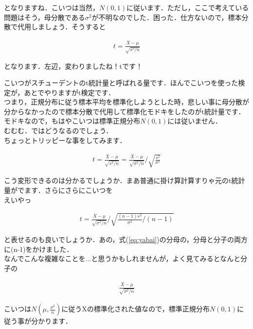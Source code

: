 \documentclass[11pt,a4paper]{ujreport} 	%
\begin{document}
となりますね．こいつは当然，$N(0,1)$に従います．ただし，ここで考えている問題はそう，母分散である$\sigma^2$が不明なのでした．困った．仕方ないので，標本分散で代用しましょう．そうすると

\begin{align}
  t = \frac{\bar{X}- \mu}{\sqrt{s^2/n}}
  \label{eq:t-value}
\end{align}

となります．左辺，変わりましたね！tです！

こいつがスチューデントのt統計量と呼ばれる量です．ほんでこいつを使った検定が，あとでやりますがt検定です．\\

つまり，正規分布に従う標本平均を標準化しようとした時，悲しい事に母分散が分からなかったので標本分散で代用して標準化モドキをしたのがt統計量です．\\

モドキなので，もはやこいつは標準正規分布$N(0,1)$には従いません．\\

むむむ．ではどうなるのでしょう．\\

ちょっとトリッピーな事をしてみます．

\begin{align}
  t = \frac{\bar{X}-\mu}{\sqrt{s^2/n}} = \frac{\bar{X}-\mu}{\sqrt{\sigma^2/n}} / \sqrt{\frac{s^2}{\sigma^2}}
  \label{eq:yabai}
\end{align}

こう変形できるのは分かるでしょうか．まあ普通に掛け算計算すりゃ元のt統計量がでます．さらにさらにこいつを\\

えいやっ

\begin{align}
  t = \frac{\bar{X}- \mu}{\sqrt{\sigma^2/n}} / \sqrt{\frac{(n-1)s^2}{\sigma^2}/(n-1)}
\end{align}

と表せるのも良いでしょうか．あの，式(\ref{eq:yabai})の分母の，分母と分子の両方に(n-1)をかけました．\\

なんでこんな複雑なことを...と思うかもしれませんが，よく見てみるとなんと分子の

\begin{align}
  \frac{\bar{X}- \mu}{\sqrt{\sigma^2/n}}
\end{align}

こいつは$N(\mu, \frac{\sigma^2}{n})$に従うXの標準化された値なので，標準正規分布$N(0,1)$に従う事が分かります．\\
\end{document}
